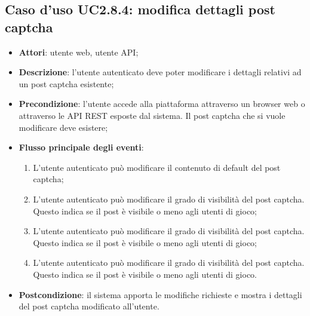 \subsection{Caso d'uso UC2.8.4: modifica dettagli post captcha}
\begin{itemize}
\item \textbf{Attori}: utente web, utente API;
\item \textbf{Descrizione}: l'utente autenticato deve poter modificare i dettagli relativi ad un post captcha esistente; 
      \item \textbf{Precondizione}: l'utente accede alla piattaforma attraverso un browser web o attraverso le API REST esposte dal sistema. Il post captcha che si vuole modificare deve esistere;

        \item \textbf{Flusso principale degli eventi}:
          \begin{enumerate}
          \item L'utente autenticato può modificare il contenuto di default del post captcha;
          \item L'utente autenticato può modificare il grado di visibilità del post captcha. Questo indica se il post è visibile o meno agli utenti di gioco;
          \item L'utente autenticato può modificare il grado di visibilità del post captcha. Questo indica se il post è visibile o meno agli utenti di gioco;
          \item L'utente autenticato può modificare il grado di visibilità del post captcha. Questo indica se il post è visibile o meno agli utenti di gioco.

      \end{enumerate}
    \item \textbf{Postcondizione}: il sistema apporta le modifiche richieste e mostra i dettagli del post captcha modificato all'utente.
  \end{itemize}
\hypertarget{UC2.8.5}{}
